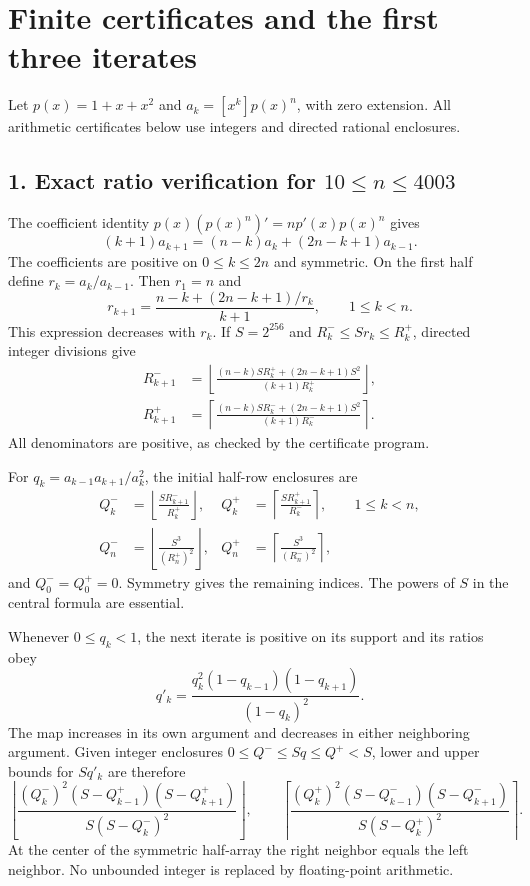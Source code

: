 \documentclass[
  11pt,
]{article}
\begin{document}
\section{Finite certificates and the first three
iterates}\label{finite-certificates-and-the-first-three-iterates}

Let \(p(x)=1+x+x^2\) and \(a_k=[x^k]p(x)^n\), with zero extension. All
arithmetic certificates below use integers and directed rational
enclosures.

\subsection{\texorpdfstring{1. Exact ratio verification for
\(10\le n\le4003\)}{1. Exact ratio verification for 10\textbackslash le n\textbackslash le4003}}\label{exact-ratio-verification-for-10le-nle4003}

The coefficient identity \(p(x)(p(x)^n)'=np'(x)p(x)^n\) gives \[
(k+1)a_{k+1}=(n-k)a_k+(2n-k+1)a_{k-1}.
\] The coefficients are positive on \(0\le k\le2n\) and symmetric. On
the first half define \(r_k=a_k/a_{k-1}\). Then \(r_1=n\) and \[
r_{k+1}=\frac{n-k+(2n-k+1)/r_k}{k+1},\qquad 1\le k<n.
\] This expression decreases with \(r_k\). If \(S=2^{256}\) and
\(R_k^-\le Sr_k\le R_k^+\), directed integer divisions give \[
\begin{aligned}
R_{k+1}^-&=\left\lfloor\frac{(n-k)SR_k^++(2n-k+1)S^2}{(k+1)R_k^+}\right\rfloor,\\
R_{k+1}^+&=\left\lceil\frac{(n-k)SR_k^-+(2n-k+1)S^2}{(k+1)R_k^-}\right\rceil.
\end{aligned}
\] All denominators are positive, as checked by the certificate program.

For \(q_k=a_{k-1}a_{k+1}/a_k^2\), the initial half-row enclosures are \[
\begin{aligned}
Q_k^-&=\left\lfloor\frac{SR_{k+1}^-}{R_k^+}\right\rfloor,&
Q_k^+&=\left\lceil\frac{SR_{k+1}^+}{R_k^-}\right\rceil,
&&1\le k<n,\\
Q_n^-&=\left\lfloor\frac{S^3}{(R_n^+)^2}\right\rfloor,&
Q_n^+&=\left\lceil\frac{S^3}{(R_n^-)^2}\right\rceil,
\end{aligned}
\] and \(Q_0^-=Q_0^+=0\). Symmetry gives the remaining indices. The
powers of \(S\) in the central formula are essential.

Whenever \(0\le q_k<1\), the next iterate is positive on its support and
its ratios obey \[
q'_k=\frac{q_k^2(1-q_{k-1})(1-q_{k+1})}{(1-q_k)^2}.
\] The map increases in its own argument and decreases in either
neighboring argument. Given integer enclosures
\(0\le Q^-\le Sq\le Q^+<S\), lower and upper bounds for \(Sq'_k\) are
therefore \[
\left\lfloor\frac{(Q_k^-)^2(S-Q_{k-1}^+)(S-Q_{k+1}^+)}{S(S-Q_k^-)^2}\right\rfloor,
\qquad
\left\lceil\frac{(Q_k^+)^2(S-Q_{k-1}^-)(S-Q_{k+1}^-)}{S(S-Q_k^+)^2}\right\rceil.
\] At the center of the symmetric half-array the right neighbor equals
the left neighbor. No unbounded integer is replaced by floating-point
arithmetic.
\end{document}
